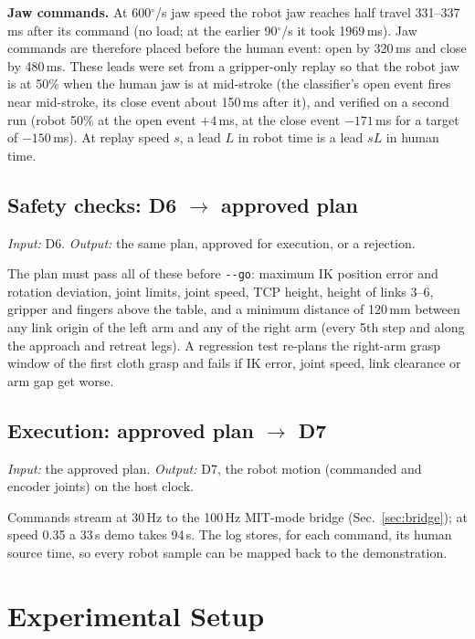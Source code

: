 \documentclass[conference,10pt]{IEEEtran}
\newcommand{\mm}{\,mm\xspace}
\begin{document}
\textbf{Jaw commands.} At 600$^\circ$/s jaw speed the robot jaw reaches half travel 331--337\,ms after its command (no load;
at the earlier 90$^\circ$/s it took 1969\,ms). Jaw commands are therefore placed before the human event: open by 320\,ms
and close by 480\,ms. These leads were set from a gripper-only replay so that the robot jaw is at 50\% when the human jaw
is at mid-stroke (the classifier's open event fires near mid-stroke, its close event about 150\,ms after it), and verified
on a second run (robot 50\% at the open event $+4$\,ms, at the close event $-171$\,ms for a target of $-150$\,ms). At replay
speed $s$, a lead $L$ in robot time is a lead $sL$ in human time.

\subsection{Safety checks: D6 $\to$ approved plan}\label{sec:checks}
\emph{Input:} D6. \emph{Output:} the same plan, approved for execution, or a rejection.

The plan must pass all of these before \texttt{-{}-go}: maximum IK position error and rotation deviation, joint limits,
joint speed, TCP height, height of links 3--6, gripper and fingers above the table, and a minimum distance of 120\mm
between any link origin of the left arm and any of the right arm (every 5th step and along the approach and retreat legs).
A regression test re-plans the right-arm grasp window of the first cloth grasp and fails if IK error, joint speed, link
clearance or arm gap get worse.

\subsection{Execution: approved plan $\to$ D7}\label{sec:replay}
\emph{Input:} the approved plan. \emph{Output:} D7, the robot motion (commanded and encoder joints) on the host clock.

Commands stream at 30\,Hz to the 100\,Hz MIT-mode bridge (Sec.~\ref{sec:bridge}); at speed 0.35 a 33\,s demo takes 94\,s.
The log stores, for each command, its human source time, so every robot sample can be mapped back to the demonstration.

\section{Experimental Setup}\label{sec:setup}
\end{document}
